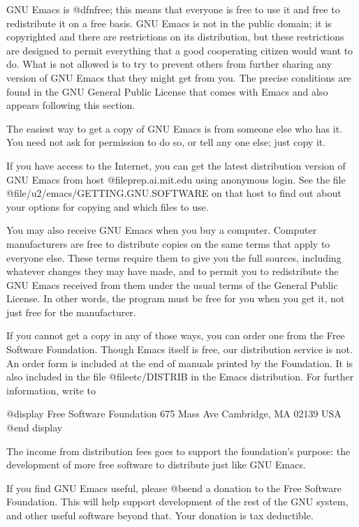 GNU Emacs is @dfn{free}; this means that everyone is free to use it and
free to redistribute it on a free basis.  GNU Emacs is not in the public
domain; it is copyrighted and there are restrictions on its
distribution, but these restrictions are designed to permit everything
that a good cooperating citizen would want to do.  What is not allowed
is to try to prevent others from further sharing any version of GNU
Emacs that they might get from you.  The precise conditions are found in
the GNU General Public License that comes with Emacs and also appears
following this section.

The easiest way to get a copy of GNU Emacs is from someone else who has it.
You need not ask for permission to do so, or tell any one else; just copy
it.

If you have access to the Internet, you can get the latest distribution
version of GNU Emacs from host @file{prep.ai.mit.edu} using anonymous
login.  See the file @file{/u2/emacs/GETTING.GNU.SOFTWARE} on that host
to find out about your options for copying and which files to use.

You may also receive GNU Emacs when you buy a computer.  Computer
manufacturers are free to distribute copies on the same terms that apply to
everyone else.  These terms require them to give you the full sources,
including whatever changes they may have made, and to permit you to
redistribute the GNU Emacs received from them under the usual terms of the
General Public License.  In other words, the program must be free for you
when you get it, not just free for the manufacturer.

If you cannot get a copy in any of those ways, you can order one from the
Free Software Foundation.  Though Emacs itself is free, our distribution
service is not.  An order form is included at the end of manuals printed by
the Foundation.  It is also included in the file @file{etc/DISTRIB} in the
Emacs distribution.  For further information, write to

@display
Free Software Foundation
675 Mass Ave
Cambridge, MA 02139
USA
@end display

The income from distribution fees goes to support the foundation's
purpose: the development of more free software to distribute just like
GNU Emacs.

If you find GNU Emacs useful, please @b{send a donation} to the Free
Software Foundation.  This will help support development of the rest of the
GNU system, and other useful software beyond that.  Your donation is tax
deductible.

